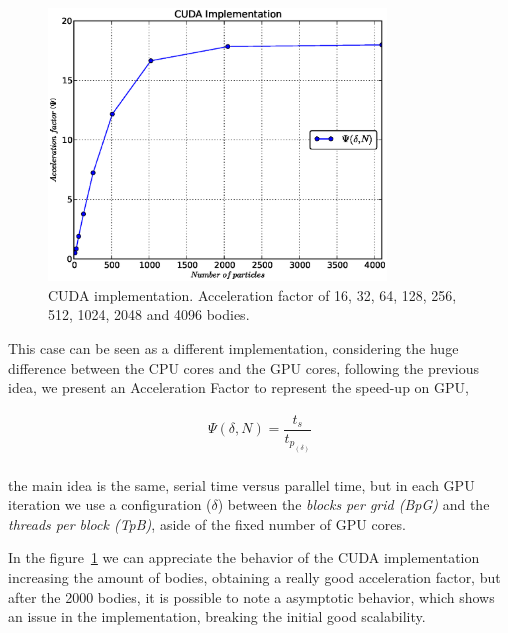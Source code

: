 \begin{figure}[h!t]
    \centering
    \includegraphics[width=0.8\textwidth]{images/cuda.eps}
    \caption{CUDA implementation. Acceleration factor of 16, 32, 64, 128, 256, 512, 1024, 2048 and 4096 bodies.}
    \label{fig:cuda}
\end{figure}

This case can be seen as a different implementation,
considering the huge difference between the CPU cores and the GPU cores,
following the previous idea, we present an Acceleration Factor to represent the speed-up on GPU,

\begin{eqnarray}
    \Psi(\delta,N) = \dfrac{t_{s}}{t_{p_{(\delta)}}} \\
\end{eqnarray}

the main idea is the same, serial time versus parallel time,
but in each GPU iteration we use a configuration ($\delta$) between the
\emph{blocks per grid (BpG)} and the \emph{threads per block (TpB)},
aside of the fixed number of GPU cores.

In the figure~\ref{fig:cuda} we can appreciate
the behavior of the CUDA implementation increasing the amount of bodies,
obtaining a really good acceleration factor,
but after the 2000 bodies, it is possible to note
a asymptotic behavior, which shows an issue in the implementation,
breaking the initial good scalability.


